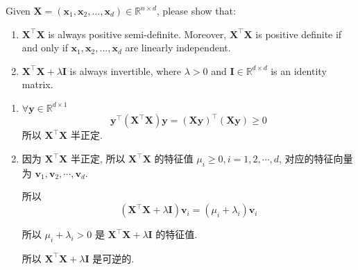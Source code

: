 \documentclass[11pt,letter,notitlepage]{article}
\begin{document}
\newpage




\begin{exercise}
    Given $\mathbf{X}=(\mathbf{x}_1, \mathbf{x}_2, \dots, \mathbf{x}_d)\in \mathbb{R}^{n\times d}$, please show that:
    \begin{enumerate}
        \item $\mathbf{X}^{\top}\mathbf{X}$ is always positive semi-definite. Moreover, $\mathbf{X}^{\top}\mathbf{X}$ is positive definite if and only if $\mathbf{x}_1, \mathbf{x}_2, \dots, \mathbf{x}_d$ are linearly independent.
        \item $\mathbf{X}^{\top}\mathbf{X} + \lambda \mathbf{I}$ is always invertible, where $\lambda>0$ and $\mathbf{I}\in \mathbb{R}^{d\times d}$ is an identity matrix.
    \end{enumerate}


\end{exercise}

\begin{solution}
    \begin{enumerate}
        \item $\forall \mathbf{y}\in\mathbb{R}^{d\times 1}$
              $$\mathbf{y}^\top \left( \mathbf{X}^\top \mathbf{X} \right) \mathbf{y}=\left(\mathbf{X}\mathbf{y}\right)^\top \left(\mathbf{X}\mathbf{y}\right)\geq 0$$
              所以 $\mathbf{X}^\top\mathbf{X}$ 半正定.
        \item 因为 $\mathbf{X}^\top\mathbf{X}$ 半正定, 所以 $\mathbf{X}^\top\mathbf{X}$ 的特征值 $\mu_i \ge 0, i=1,2,\cdots,d$, 对应的特征向量为 $\mathbf{v}_1,\mathbf{v}_2,\cdots,\mathbf{v}_d$.

              所以
              $$\left( \mathbf{X}^\top\mathbf{X}+\lambda \mathbf{I} \right)\mathbf{v}_i=(\mu_i+\lambda_i)\mathbf{v}_i$$

              所以 $\mu_i+\lambda_i> 0$ 是 $\mathbf{X}^\top\mathbf{X}+\lambda \mathbf{I}$ 的特征值.

              所以 $\mathbf{X}^\top\mathbf{X}+\lambda \mathbf{I}$ 是可逆的.
    \end{enumerate}
\end{solution}


\newpage
\end{document}
